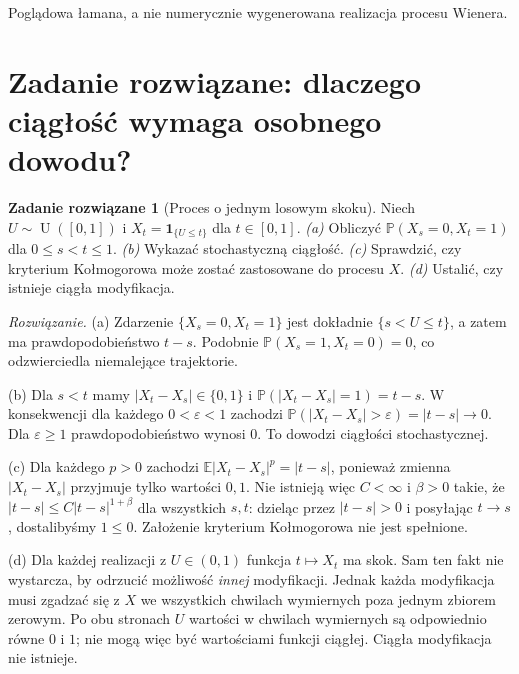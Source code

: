 \documentclass[11pt,a4paper,oneside]{report}
\numberwithin{equation}{chapter}
\theoremstyle{plain}
\theoremstyle{definition}
\newtheorem{zadanie}{Zadanie rozwiązane}[chapter]
\theoremstyle{remark}
\newcommand{\Prob}{\mathbb{P}}
\newcommand{\E}{\mathbb{E}}
\newcommand{\ind}[1]{\mathbf{1}_{#1}}
\begin{document}
\begin{center}
\par\smallskip\small Poglądowa łamana, a nie numerycznie wygenerowana realizacja procesu Wienera.
\end{center}

\section{Zadanie rozwiązane: dlaczego ciągłość wymaga osobnego dowodu?}
\begin{zadanie}[Proces o jednym losowym skoku]
Niech $U\sim\operatorname{U}([0,1])$ i
$X_t=\ind{\{U\le t\}}$ dla $t\in[0,1]$.
\emph{(a)} Obliczyć $\Prob(X_s=0,X_t=1)$ dla $0\le s<t\le1$.
\emph{(b)} Wykazać stochastyczną ciągłość.
\emph{(c)} Sprawdzić, czy kryterium Kołmogorowa może
zostać zastosowane do procesu $X$.
\emph{(d)} Ustalić, czy istnieje ciągła modyfikacja.

\emph{Rozwiązanie.}
(a) Zdarzenie $\{X_s=0,X_t=1\}$ jest dokładnie
$\{s<U\le t\}$, a zatem ma prawdopodobieństwo $t-s$.
Podobnie $\Prob(X_s=1,X_t=0)=0$, co odzwierciedla
niemalejące trajektorie.

(b) Dla $s<t$ mamy $|X_t-X_s|\in\{0,1\}$ i
$\Prob(|X_t-X_s|=1)=t-s$. W konsekwencji dla każdego
$0<\varepsilon<1$ zachodzi
$\Prob(|X_t-X_s|>\varepsilon)=|t-s|\to0$.
Dla $\varepsilon\ge1$ prawdopodobieństwo wynosi $0$.
To dowodzi ciągłości stochastycznej.

(c) Dla każdego $p>0$ zachodzi
$\E|X_t-X_s|^p=|t-s|$, ponieważ zmienna
$|X_t-X_s|$ przyjmuje tylko wartości $0,1$.
Nie istnieją więc $C<\infty$ i $\beta>0$ takie, że
$|t-s|\le C|t-s|^{1+\beta}$ dla wszystkich $s,t$:
dzieląc przez $|t-s|>0$ i posyłając $t\to s$,
dostalibyśmy $1\le0$. Założenie kryterium
Kołmogorowa nie jest spełnione.

(d) Dla każdej realizacji z $U\in(0,1)$ funkcja
$t\mapsto X_t$ ma skok. Sam ten fakt nie wystarcza,
by odrzucić możliwość \emph{innej} modyfikacji.
Jednak każda modyfikacja musi zgadzać się z $X$
we wszystkich chwilach wymiernych poza jednym zbiorem
zerowym. Po obu stronach $U$ wartości w chwilach
wymiernych są odpowiednio równe $0$ i $1$; nie
mogą więc być wartościami funkcji ciągłej.
Ciągła modyfikacja nie istnieje.
\end{zadanie}
\end{document}
